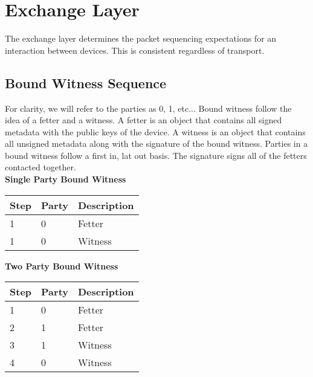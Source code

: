 \documentclass[11pt]{article}
\begin{document}
\section{Exchange Layer}
The exchange layer determines the packet sequencing expectations for an interaction
between devices.  This is consistent regardless of transport.

\subsection{Bound Witness Sequence}
For clarity, we will refer to the parties as 0, 1, etc... Bound witness follow the idea of a fetter and a witness. A fetter is an object that contains all signed metadata with the public keys of the device. A witness is an object that contains all unsigned metadata along with the signature of the bound witness. Parties in a bound witness follow a first in, lat out basis. The signature signs all of the fetters contacted together. \\

\noindent
\textbf{Single Party Bound Witness} \\
\begin{center}
	\begin{tabular}{ |l|l|l| }
		\hline
		\textbf{Step} & \textbf{Party} & \textbf{Description} \\
		\hline
						
		1             & 0              & Fetter               \\
		1             & 0              & Witness              \\
						
		\hline
	\end{tabular}
\end{center}


\noindent
\textbf{Two Party Bound Witness} \\
\begin{center}
	\begin{tabular}{ |l|l|l| }
		\hline
		\textbf{Step} & \textbf{Party} & \textbf{Description} \\
		\hline
						
		1             & 0              & Fetter               \\
		2             & 1              & Fetter               \\
		3             & 1              & Witness              \\
		4             & 0              & Witness              \\
						
		\hline
	\end{tabular}
\end{center}
\end{document}

